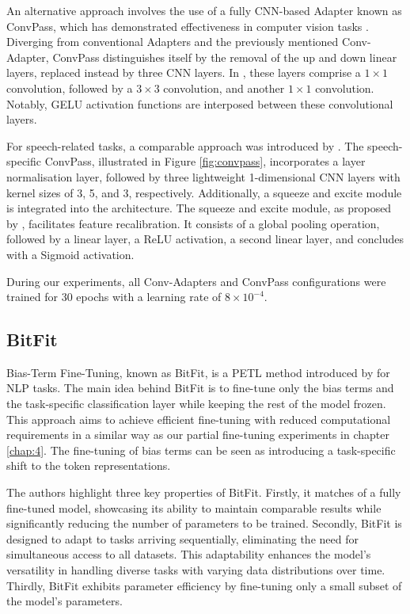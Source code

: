An alternative approach involves the use of a fully \ac{CNN}-based Adapter known as ConvPass, which has demonstrated effectiveness in computer vision tasks \cite{jie2022convolutional}. Diverging from conventional Adapters and the previously mentioned Conv-Adapter, ConvPass distinguishes itself by the removal of the up and down linear layers, replaced instead by three \ac{CNN} layers. In \cite{jie2022convolutional}, these layers comprise a $1 \times 1$ convolution, followed by a $3 \times 3$ convolution, and another $1 \times 1$ convolution. Notably, \ac{GELU} activation functions are interposed between these convolutional layers.

For speech-related tasks, a comparable approach was introduced by \cite{li2023evaluating}. The speech-specific ConvPass, illustrated in Figure \ref{fig:convpass}, incorporates a layer normalisation layer, followed by three lightweight 1-dimensional \ac{CNN} layers with kernel sizes of 3, 5, and 3, respectively. Additionally, a squeeze and excite module is integrated into the architecture. The squeeze and excite module, as proposed by \cite{hu2018squeeze}, facilitates feature recalibration. It consists of a global pooling operation, followed by a linear layer, a \ac{ReLU} activation, a second linear layer, and concludes with a Sigmoid activation.

During our experiments, all Conv-Adapters and ConvPass configurations were trained for 30 epochs with a learning rate of $8 \times 10^{-4}$.


\subsection{BitFit}
Bias-Term Fine-Tuning, known as BitFit, is a \ac{PETL} method introduced by \cite{ben-zaken-etal-2022-bitfit} for NLP tasks. The main idea behind BitFit is to fine-tune only the bias terms and the task-specific classification layer while keeping the rest of the model frozen. This approach aims to achieve efficient fine-tuning with reduced computational requirements in a similar way as our partial fine-tuning experiments in chapter \ref{chap:4}. The fine-tuning of bias terms can be seen as introducing a task-specific shift to the token representations.

The authors highlight three key properties of BitFit. Firstly, it matches of a fully fine-tuned model, showcasing its ability to maintain comparable results while significantly reducing the number of parameters to be trained. Secondly, BitFit is designed to adapt to tasks arriving sequentially, eliminating the need for simultaneous access to all datasets. This adaptability enhances the model's versatility in handling diverse tasks with varying data distributions over time. Thirdly, BitFit exhibits parameter efficiency by fine-tuning only a small subset of the model's parameters.

